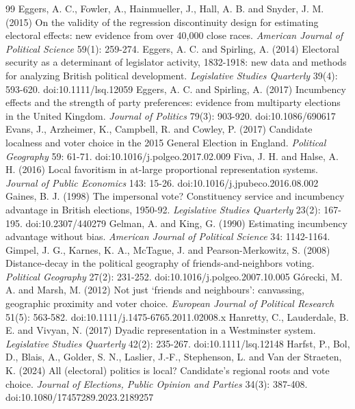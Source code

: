 \documentclass[11pt,a4paper]{article}
\begin{document}
\begin{thebibliography}{99}
 Eggers, A. C., Fowler, A., Hainmueller, J., Hall, A. B. and Snyder, J. M. (2015) On the validity of the regression discontinuity design for estimating electoral effects: new evidence from over 40,000 close races. \textit{American Journal of Political Science} 59(1): 259-274.
 Eggers, A. C. and Spirling, A. (2014) Electoral security as a determinant of legislator activity, 1832-1918: new data and methods for analyzing British political development. \textit{Legislative Studies Quarterly} 39(4): 593-620. doi:10.1111/lsq.12059
 Eggers, A. C. and Spirling, A. (2017) Incumbency effects and the strength of party preferences: evidence from multiparty elections in the United Kingdom. \textit{Journal of Politics} 79(3): 903-920. doi:10.1086/690617
 Evans, J., Arzheimer, K., Campbell, R. and Cowley, P. (2017) Candidate localness and voter choice in the 2015 General Election in England. \textit{Political Geography} 59: 61-71. doi:10.1016/j.polgeo.2017.02.009
 Fiva, J. H. and Halse, A. H. (2016) Local favoritism in at-large proportional representation systems. \textit{Journal of Public Economics} 143: 15-26. doi:10.1016/j.jpubeco.2016.08.002
 Gaines, B. J. (1998) The impersonal vote? Constituency service and incumbency advantage in British elections, 1950-92. \textit{Legislative Studies Quarterly} 23(2): 167-195. doi:10.2307/440279
 Gelman, A. and King, G. (1990) Estimating incumbency advantage without bias. \textit{American Journal of Political Science} 34: 1142-1164.
 Gimpel, J. G., Karnes, K. A., McTague, J. and Pearson-Merkowitz, S. (2008) Distance-decay in the political geography of friends-and-neighbors voting. \textit{Political Geography} 27(2): 231-252. doi:10.1016/j.polgeo.2007.10.005
 G\'orecki, M. A. and Marsh, M. (2012) Not just `friends and neighbours': canvassing, geographic proximity and voter choice. \textit{European Journal of Political Research} 51(5): 563-582. doi:10.1111/j.1475-6765.2011.02008.x
 Hanretty, C., Lauderdale, B. E. and Vivyan, N. (2017) Dyadic representation in a Westminster system. \textit{Legislative Studies Quarterly} 42(2): 235-267. doi:10.1111/lsq.12148
 Harfst, P., Bol, D., Blais, A., Golder, S. N., Laslier, J.-F., Stephenson, L. and Van der Straeten, K. (2024) All (electoral) politics is local? Candidate's regional roots and vote choice. \textit{Journal of Elections, Public Opinion and Parties} 34(3): 387-408. doi:10.1080/17457289.2023.2189257

\end{thebibliography}
\end{document}
